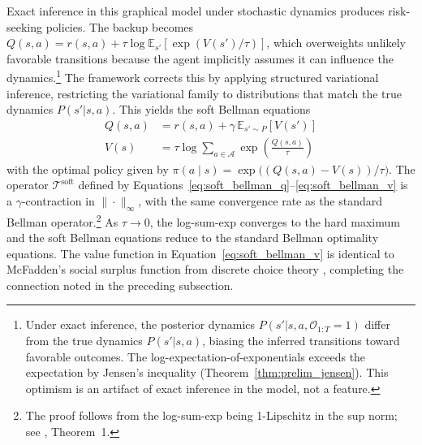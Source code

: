 Exact inference in this graphical model under stochastic dynamics produces risk-seeking policies. The backup becomes $Q(s,a) = r(s,a) + \tau \log \mathbb{E}_{s'}[\exp(V(s')/\tau)]$, which overweights unlikely favorable transitions because the agent implicitly assumes it can influence the dynamics.\footnote{Under exact inference, the posterior dynamics $P(s'|s,a,\mathcal{O}_{1:T}=1)$ differ from the true dynamics $P(s'|s,a)$, biasing the inferred transitions toward favorable outcomes. The log-expectation-of-exponentials exceeds the expectation by Jensen's inequality (Theorem~\ref{thm:prelim_jensen}). This optimism is an artifact of exact inference in the model, not a feature.} The framework corrects this by applying structured variational inference, restricting the variational family to distributions that match the true dynamics $P(s'|s,a)$. This yields the soft Bellman equations
\begin{align}
Q(s,a) &= r(s,a) + \gamma \, \mathbb{E}_{s' \sim P}[V(s')] \label{eq:soft_bellman_q} \\
V(s) &= \tau \log \sum_{a \in \mathcal{A}} \exp\!\left(\frac{Q(s,a)}{\tau}\right) \label{eq:soft_bellman_v}
\end{align}
with the optimal policy given by $\pi(a \mid s) = \exp\bigl((Q(s,a) - V(s))/\tau\bigr)$. The operator $\mathcal{T}^{\mathrm{soft}}$ defined by Equations~\eqref{eq:soft_bellman_q}--\eqref{eq:soft_bellman_v} is a $\gamma$-contraction in $\|\cdot\|_\infty$, with the same convergence rate as the standard Bellman operator.\footnote{The proof follows from the log-sum-exp being 1-Lipschitz in the sup norm; see \citet{Haarnoja2017}, Theorem~1.} As $\tau \to 0$, the log-sum-exp converges to the hard maximum and the soft Bellman equations reduce to the standard Bellman optimality equations. The value function in Equation~\eqref{eq:soft_bellman_v} is identical to McFadden's social surplus function from discrete choice theory \citep{McFadden1978}, completing the connection noted in the preceding subsection.

